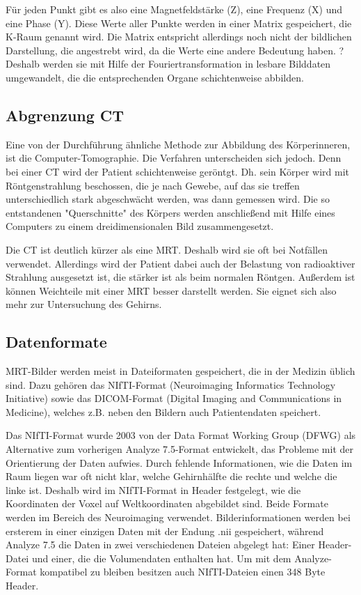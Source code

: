 Für jeden Punkt gibt es also eine Magnetfeldstärke (Z), eine Frequenz (X) und eine Phase (Y). Diese Werte aller Punkte werden in einer Matrix gespeichert, die K-Raum genannt wird. Die Matrix entspricht allerdings noch nicht der bildlichen Darstellung, die angestrebt wird, da die Werte eine andere Bedeutung haben. ? Deshalb werden sie mit Hilfe der Fouriertransformation in lesbare Bilddaten umgewandelt, die die entsprechenden Organe schichtenweise abbilden. 
\cite{weishaupt09}

\subsection{Abgrenzung CT}
Eine von der Durchführung ähnliche Methode zur Abbildung des Körperinneren, ist die Computer-Tomographie. Die Verfahren unterscheiden sich jedoch. Denn bei einer CT wird der Patient schichtenweise geröntgt. Dh. sein Körper wird mit Röntgenstrahlung beschossen, die je nach Gewebe, auf das sie treffen unterschiedlich stark abgeschwächt werden, was dann gemessen wird. Die so entstandenen "Querschnitte" des Körpers werden anschließend mit Hilfe eines Computers zu einem dreidimensionalen Bild zusammengesetzt. 

Die CT ist deutlich kürzer als eine MRT. Deshalb wird sie oft bei Notfällen verwendet. Allerdings wird der Patient dabei auch der Belastung von radioaktiver Strahlung ausgesetzt ist, die stärker ist als beim normalen Röntgen. Außerdem ist können Weichteile mit einer MRT besser darstellt werden. Sie eignet sich also mehr zur Untersuchung des Gehirns.


\subsection{Datenformate}

MRT-Bilder werden meist in Dateiformaten gespeichert, die in der Medizin üblich sind. Dazu gehören das NIfTI-Format (Neuroimaging Informatics Technology Initiative) sowie das DICOM-Format (Digital Imaging and Communications in Medicine), welches z.B. neben den Bildern auch Patientendaten speichert.

Das NIfTI-Format wurde 2003 von der Data Format Working Group (DFWG) als Alternative zum vorherigen Analyze 7.5-Format entwickelt, das Probleme mit der Orientierung der Daten aufwies. Durch fehlende Informationen, wie die Daten im Raum liegen war oft nicht klar, welche Gehirnhälfte die rechte und welche die linke ist. Deshalb wird im NIfTI-Format in Header festgelegt, wie die Koordinaten der Voxel auf Weltkoordinaten abgebildet sind. Beide Formate werden im Bereich des Neuroimaging verwendet.
Bilderinformationen werden bei ersterem in einer einzigen Daten mit der Endung .nii gespeichert, während Analyze 7.5 die Daten in zwei verschiedenen Dateien abgelegt hat: Einer Header-Datei und einer, die die Volumendaten enthalten hat. Um mit dem Analyze-Format kompatibel zu bleiben besitzen auch NIfTI-Dateien einen 348 Byte Header.
 
